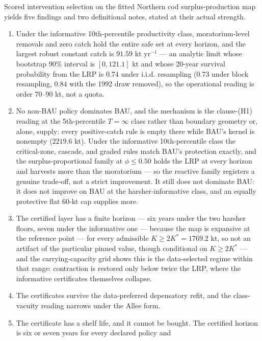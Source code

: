 Scored intervention selection on the fitted Northern cod
surplus-production map yields five findings and two definitional notes,
stated at their actual strength.

\begin{enumerate}
\def\labelenumi{(\arabic{enumi})}
\item
  Under the informative 10th-percentile productivity class,
  moratorium-level removals and zero catch hold the entire safe set at
  every horizon, and the largest robust constant catch is \(91.59\) kt
  yr\(^{-1}\) --- an analytic limit whose bootstrap \(90\%\) interval is
  \([0, 121.1]\) kt and whose 20-year survival probability from the LRP
  is \(0.74\) under i.i.d. resampling (\(0.73\) under block
  resampling, \(0.84\) with the 1992 draw removed), so the operational
  reading is order
  \(70\)--\(90\) kt, not a quota.
\item
  No non-BAU policy dominates BAU, and the mechanism is the clause-(H1)
  reading at the 5th-percentile \(T=\infty\) class rather than boundary
  geometry or, alone, supply: every positive-catch rule is empty there
  while BAU's kernel is nonempty (\(2219.6\) kt). Under the informative
  10th-percentile class the critical-zone, cascade, and graded rules
  match BAU's protection exactly, and the surplus-proportional family at
  \(\phi \le 0.50\) holds the LRP at every horizon and harvests more
  than the moratorium --- so the reactive family registers a genuine
  trade-off, not a strict improvement. It still does not dominate BAU:
  it does not improve on BAU at the harsher-informative class, and an
  equally protective flat 60-kt cap supplies more.
\item
  The certified layer has a finite horizon --- six years under the two
  harsher floors, seven under the informative one --- because the map
  is expansive at the reference point --- for every admissible
  \(K \ge 2K^* = 1769.2\) kt, so not an artifact of the particular
  pinned value, though conditional on \(K \ge 2K^*\) --- and the
  carrying-capacity grid shows this is the data-selected regime within
  that range: contraction is restored only below twice the LRP, where
  the informative certificates themselves collapse.
\item
  The certificates survive the data-preferred depensatory refit, and the
  class-vacuity reading narrows under the Allee form.
\item
  The certificate has a shelf life, and it cannot be bought. The
  certified horizon is six or seven years for every declared policy and

\end{enumerate}
